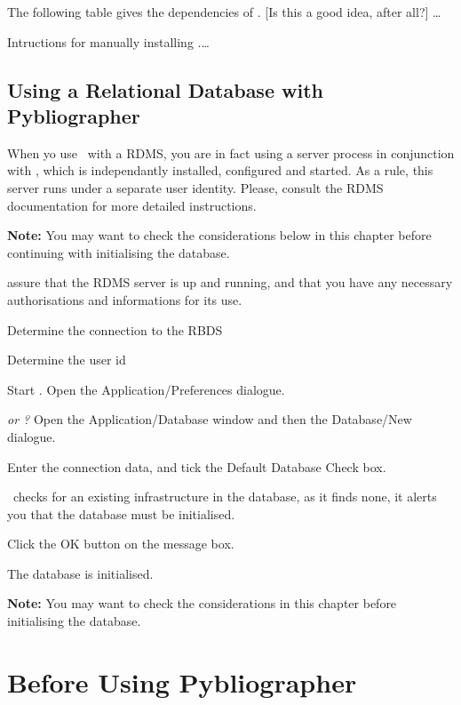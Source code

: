 The following table gives the dependencies of \Pyb. [Is this a good
idea, after all?] \dots

Intructions for manually installing \Pyb.\dots


\subsection{Using a Relational Database with Pybliographer}
\label{sec:rginstdb}

When yo use \Pyb\ with a RDMS, you are in fact using a server process
in conjunction with \Pyb, which is independantly installed, configured
and started. As a rule, this server runs under a separate user
identity. Please, consult the RDMS documentation for more detailed
instructions. 

\textbf{Note:} You may want to check the considerations below in this
chapter before continuing with initialising the database.


\begin{enumerate*}
\item assure that the RDMS server is up and running, and that you have
  any necessary authorisations and informations for its use.
\item Determine the connection to the RBDS 
\item Determine the user id 
\item Start \Pyb. Open the \textsf{Application\slash Preferences} dialogue.
\item \textit{or ?} Open the \textsf{Application\slash Database} window and
  then the \textsf{Database/New} dialogue.
\item Enter the connection data, and tick the \textsf{Default
    Database} Check box.
\item \Pyb\ checks for an  existing infrastructure in the database, as
  it finds none, it alerts you that the database must be initialised.
\item Click the \textsf{OK} button on the message box.
\item The database is initialised.
\end{enumerate*}

\textbf{Note:} You may want to check the considerations in this
chapter before initialising  the database. 

 
\section{Before Using Pybliographer}
\label{sec:rginstprep}

